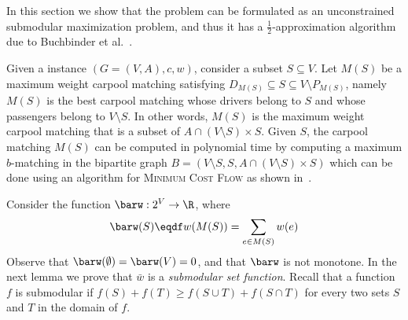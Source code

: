 
In this section we show that the \carpool problem can be formulated as
an unconstrained submodular maximization problem, and thus it has a
$\frac{1}{2}$-approximation algorithm due to Buchbinder et
al.~\cite{BFNS15,buchbinder2016deterministic}.

Given a \carpool instance $(G = (V,A), c, w)$, consider a subset
$S \subseteq V$.  Let $M(S)$ be a maximum weight carpool matching
satisfying $D_{M(S)} \subseteq S \subseteq V \setminus P_{M(S)}$,
namely $M(S)$ is the best carpool matching whose drivers belong to $S$
and whose passengers belong to $V \setminus S$.  In other words,
$M(S)$ is the maximum weight carpool matching that is a subset of
$A \cap (V \setminus S) \times S$.
%
Given $S$, the carpool matching $M(S)$ can be computed in polynomial
time by computing a maximum $b$-matching in the bipartite graph $B =
(V \setminus S, S, A \cap (V \setminus S) \times S)$ which can be done
using an algorithm for \textsc{Minimum Cost Flow} as shown
in~\cite{kutiel2017}.

Consider the function $\barw: 2^V \to \R$, where 
$$\barw(S) \eqdf w(M(S)) = \sum_{e \in M(S)} w(e)$$
Observe that $\barw(\emptyset)
= \barw(V) = 0$, and that $\barw$ is not monotone.
%
In the next lemma we prove that $\bar{w}$ is a \emph{submodular set
function}.  Recall that a function $f$ is submodular if $f(S) +
f(T) \geq f(S \cup T) + f(S \cap T)$ for every two sets $S$ and $T$ in
the domain of $f$.

